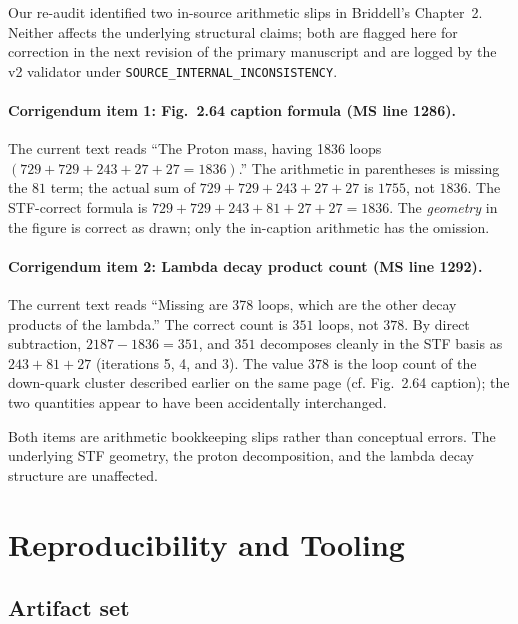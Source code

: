 \documentclass[12pt,a4paper]{article}
\begin{document}
Our re-audit identified two in-source arithmetic slips in Briddell's
Chapter~2. Neither affects the underlying structural claims; both
are flagged here for correction in the next revision of the primary
manuscript and are logged by the v2 validator under
\texttt{SOURCE\_INTERNAL\_INCONSISTENCY}.

\paragraph{Corrigendum item 1: Fig.~2.64 caption formula (MS line 1286).}
The current text reads ``The Proton mass, having 1836 loops
$(729+729+243+27+27=1836)$.'' The arithmetic in parentheses is
missing the $81$ term; the actual sum of $729+729+243+27+27$ is
$1755$, not $1836$. The STF-correct formula is
$729+729+243+81+27+27 = 1836$. The \emph{geometry} in the figure
is correct as drawn; only the in-caption arithmetic has the
omission.

\paragraph{Corrigendum item 2: Lambda decay product count
(MS line 1292).}
The current text reads ``Missing are 378 loops, which are the other
decay products of the lambda.'' The correct count is $351$ loops,
not $378$. By direct subtraction, $2187 - 1836 = 351$, and $351$
decomposes cleanly in the STF basis as $243 + 81 + 27$ (iterations
5, 4, and 3). The value $378$ is the loop count of the down-quark
cluster described earlier on the same page (cf. Fig.~2.64 caption);
the two quantities appear to have been accidentally interchanged.

Both items are arithmetic bookkeeping slips rather than conceptual
errors. The underlying STF geometry, the proton decomposition, and
the lambda decay structure are unaffected.


\section{Reproducibility and Tooling}

\subsection{Artifact set}
\end{document}
